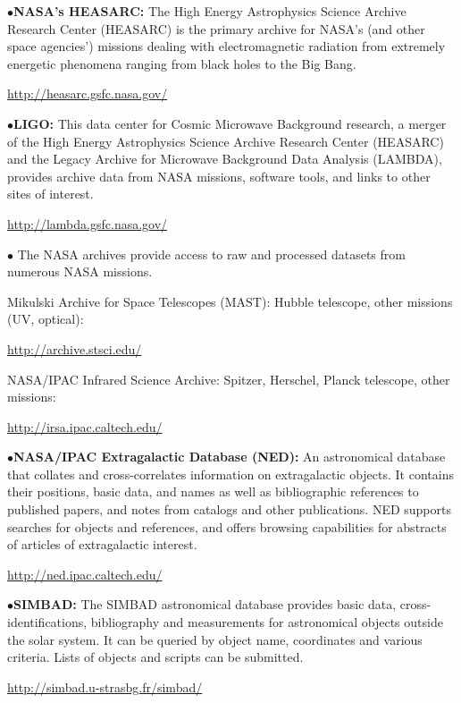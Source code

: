 \medskip

\item{$\bullet$}{\bf NASA's HEASARC:} 
The High Energy Astrophysics Science Archive Research Center (HEASARC) is the primary archive for NASA's (and other space agencies') missions dealing with electromagnetic radiation from extremely energetic phenomena ranging from black holes to the Big Bang.
	\item{}\qquad\url{http://heasarc.gsfc.nasa.gov/} 

\medskip

\item{$\bullet$}{\bf LIGO:} 
This data center for Cosmic Microwave Background research, a merger of the High Energy Astrophysics Science Archive Research Center (HEASARC) and the Legacy Archive for Microwave Background Data Analysis (LAMBDA), provides archive data from NASA missions, software tools, and links to other sites of interest.
	\item{}\qquad\url{http://lambda.gsfc.nasa.gov/}

\medskip

\item{$\bullet$}
The NASA archives provide access to raw and processed datasets from numerous NASA missions. 
\item{}
Mikulski Archive for Space Telescopes (MAST): Hubble telescope, other missions (UV, optical):
	\item{}\qquad\url{http://archive.stsci.edu/} 
\item{}
NASA/IPAC Infrared Science Archive: Spitzer, Herschel, Planck telescope, other missions: \item{}\qquad\url{http://irsa.ipac.caltech.edu/}

\medskip

\item{$\bullet$}{\bf NASA/IPAC Extragalactic Database (NED):}
An astronomical database that collates and cross-correlates information on extragalactic objects. It contains their positions, basic data, and names as well as bibliographic references to published papers, and notes from catalogs and other publications. NED supports searches for objects and references, and offers browsing capabilities for abstracts of articles of extragalactic interest.
	\item{}\qquad\url{http://ned.ipac.caltech.edu/}

\medskip

\item{$\bullet$}{\bf SIMBAD:}
The SIMBAD astronomical database provides basic data, cross-identifications, bibliography and measurements for astronomical objects outside the solar system. It can be queried by object name, coordinates and various criteria. Lists of objects and scripts can be submitted.
	\item{}\qquad\url{http://simbad.u-strasbg.fr/simbad/}

